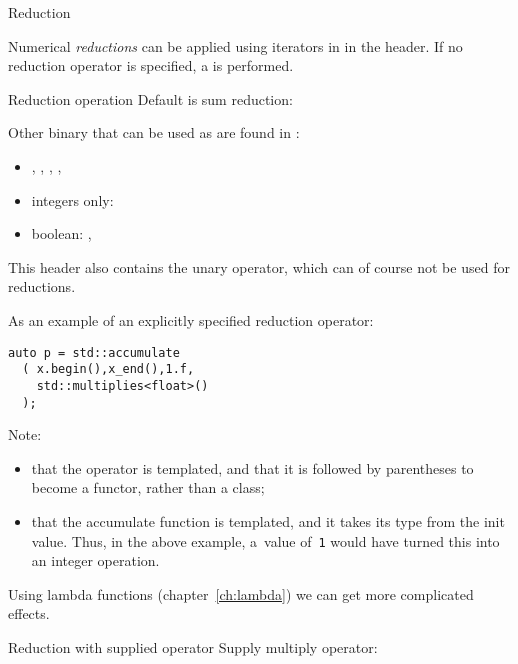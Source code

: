  {Reduction}

Numerical \emph{reductions} can be applied using iterators
in  in the  header.
If no reduction operator is specified, a
is performed.

\begin{block}{Reduction operation}
  \label{sl:vec-accumulate}
  Default is sum reduction:
\end{block}

Other binary 
that can be used as 
are found in :
\begin{itemize}
\item
  ,
  ,
  ,
  ,
\item integers only:
\item boolean:
  ,   
\end{itemize}

This header also contains the unary
 operator, which 
can of course not be used for reductions.

As an example of an explicitly specified reduction operator:
\begin{lstlisting}
auto p = std::accumulate
  ( x.begin(),x_end(),1.f,
    std::multiplies<float>()
  );
\end{lstlisting}
Note:
\begin{itemize}
\item that the operator is templated,
  and that it is followed by parentheses
  to become a functor, rather than a class;
\item that the accumulate function is templated,
  and it takes its type from the init value.
  Thus, in the above example, a~value of~\lstinline+1+
  would have turned this into an integer operation.
\end{itemize}

Using lambda functions (chapter~\ref{ch:lambda})
we can get more complicated effects.

\begin{block}{Reduction with supplied operator}
  \label{sl:vec-multiplies}
  Supply multiply operator:
\end{block}

